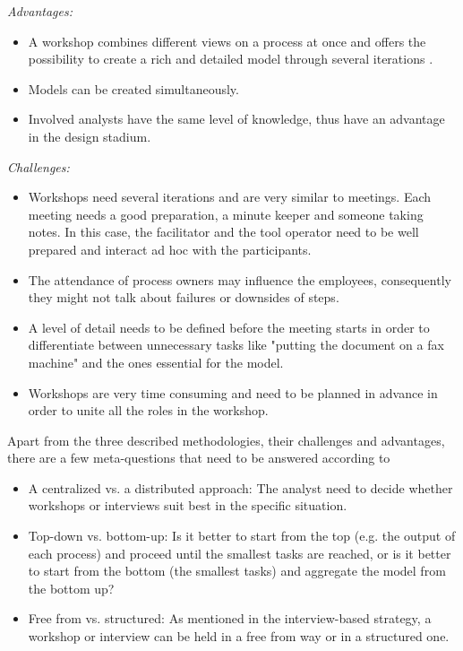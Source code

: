 \textit{Advantages:}
\begin{itemize}
\item A workshop combines different views on a process at once and offers the possibility to create a rich and detailed model through several iterations \cite{Dumas2013}. 
\item Models can be created simultaneously. 
\item Involved analysts have the same level of knowledge, thus have an advantage in the design stadium.
\end{itemize}

\textit{Challenges:}
\begin{itemize}
\item Workshops need several iterations and are very similar to meetings. Each meeting needs a good preparation, a minute keeper and someone taking notes. In this case, the facilitator and the tool operator need to be well prepared and interact ad hoc with the participants. 
\item The attendance of process owners may influence the employees, consequently they might not talk about failures or downsides of steps. 
\item A level of detail needs to be defined before the meeting starts in order to differentiate between unnecessary tasks like "putting the document on a fax machine" \cite{Dumas2013} and the ones essential for the model. 
\item Workshops are very time consuming and need to be planned in advance in order to unite all the roles in the workshop.
\end{itemize}

Apart from the three described methodologies, their challenges and advantages, there are a few meta-questions that need to be answered according to \cite{Verner2004} 
\begin{itemize}
\item A centralized vs. a distributed approach: The analyst need to decide whether workshops or interviews suit best in the specific situation.
\item Top-down vs. bottom-up: Is it better to start from the top (e.g. the output of each process) and proceed until the smallest tasks are reached, or is it better to start from the bottom (the smallest tasks) and aggregate the model from the bottom up? 
\item Free from vs. structured: As mentioned in the interview-based strategy, a workshop or interview can be held in a free from way or in a structured one. 
\end{itemize}

